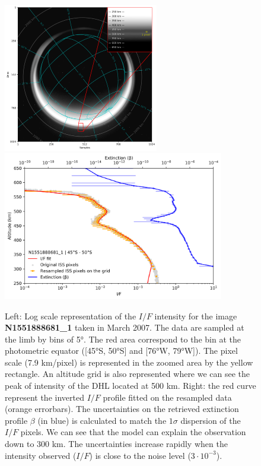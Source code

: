 \begin{figure}[!ht]
    \centering
    \includegraphics[height=6.5cm]{Fig/N1551888681_sampling.png}
    \includegraphics[height=6.5cm]{Fig/Model_uncertainties.png}
    \caption{Left: Log scale representation of the $I/F$ intensity for the image
             \textbf{N1551888681\_1} taken in March 2007. The data are sampled at the limb by
             bins of \ang{5}. The red area correspond to the bin at the photometric
             equator ([\ang{45}S, \ang{50}S] and [\ang{76}W, \ang{79}W]). The pixel scale
             (7.9 km/pixel) is represented in the zoomed area by the yellow rectangle.
             An altitude grid is also represented where we can see the peak of intensity of the DHL
             located at 500 km. Right: the red curve represent the inverted $I/F$ profile fitted
             on the resampled data (orange errorbars). The uncertainties on the retrieved
             extinction profile $\beta$ (in blue) is calculated to match the $1 \sigma$ dispersion
             of the $I/F$ pixels. We can see that the model can explain the observation down to 300 km.
             The uncertainties increase rapidly when the intensity observed ($I/F$) is close
             to the noise level ($3\cdot10^{-3}$).}
    \label{fig:model_uncertainties}
\end{figure}
